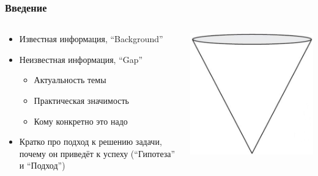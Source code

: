 \documentclass[xetex,mathserif,serif]{beamer}
\begin{document}
    \begin{frame}
        \frametitle{Введение}
        \begin{columns}
            \begin{column}{0.6\textwidth}
                \begin{itemize}
                    \item Известная информация, ``Background''
                    \item Неизвестная информация, ``Gap''
                    \begin{itemize}
                        \item Актуальность темы
                        \item Практическая значимость
                        \item Кому конкретно это надо
                    \end{itemize}
                    \item Кратко про подход к решению задачи, почему он приведёт к успеху (``Гипотеза'' и ``Подход'')
                \end{itemize}
            \end{column}
            \begin{column}{0.4\textwidth}
                \begin{center}
                    \includegraphics[width=\textwidth]{introductionCone.png}
                \end{center}
            \end{column}
        \end{columns}
    \end{frame}
\end{document}

